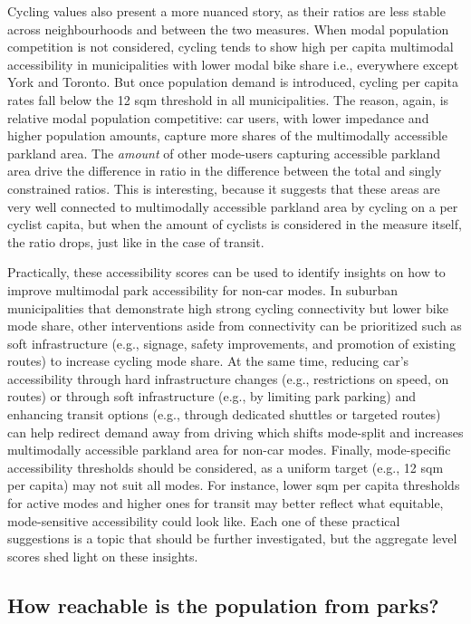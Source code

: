 \documentclass[
11pt, %
oneside, %
english, %
singlespacing, %
]{macthesis} %
\begin{document}
Cycling values also present a more nuanced story, as their ratios are less stable across neighbourhoods and between the two measures. When modal population competition is not considered, cycling tends to show high per capita multimodal accessibility in municipalities with lower modal bike share i.e., everywhere except York and Toronto. But once population demand is introduced, cycling per capita rates fall below the 12 sqm threshold in all municipalities. The reason, again, is relative modal population competitive: car users, with lower impedance and higher population amounts, capture more shares of the multimodally accessible parkland area. The \emph{amount} of other mode-users capturing accessible parkland area drive the difference in ratio in the difference between the total and singly constrained ratios. This is interesting, because it suggests that these areas are very well connected to multimodally accessible parkland area by cycling on a per cyclist capita, but when the amount of cyclists is considered in the measure itself, the ratio drops, just like in the case of transit.

Practically, these accessibility scores can be used to identify insights on how to improve multimodal park accessibility for non-car modes. In suburban municipalities that demonstrate high strong cycling connectivity but lower bike mode share, other interventions aside from connectivity can be prioritized such as soft infrastructure (e.g., signage, safety improvements, and promotion of existing routes) to increase cycling mode share. At the same time, reducing car's accessibility through hard infrastructure changes (e.g., restrictions on speed, on routes) or through soft infrastructure (e.g., by limiting park parking) and enhancing transit options (e.g., through dedicated shuttles or targeted routes) can help redirect demand away from driving which shifts mode-split and increases multimodally accessible parkland area for non-car modes. Finally, mode-specific accessibility thresholds should be considered, as a uniform target (e.g., 12 sqm per capita) may not suit all modes. For instance, lower sqm per capita thresholds for active modes and higher ones for transit may better reflect what equitable, mode-sensitive accessibility could look like. Each one of these practical suggestions is a topic that should be further investigated, but the aggregate level scores shed light on these insights.

\subsection{\texorpdfstring{\textbf{How reachable is the population from parks?}}{How reachable is the population from parks?}}\label{how-reachable-is-the-population-from-parks}
\end{document}

